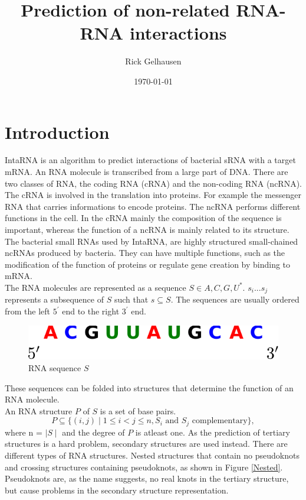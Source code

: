\documentclass[11pt,a4paper]{report}
\title{Prediction of non-related RNA-RNA interactions}
\date{\today}
\author{Rick Gelhausen}
\newcommand{\seq}{S} %
\newcommand{\str}{P} %
\begin{document}
\maketitle
\section*{Introduction}
IntaRNA is an algorithm to predict interactions of bacterial sRNA with a target mRNA. An RNA molecule is transcribed from a large part of DNA. There are two classes of RNA, the coding RNA (cRNA) and the non-coding RNA (ncRNA). The cRNA is involved in the translation into proteins. For example the messenger RNA that carries informations to encode proteins. The ncRNA performs different functions in the cell. In the cRNA mainly the composition of the sequence is important, whereas the function of a ncRNA is mainly related to its structure.\\
The bacterial small RNAs used by IntaRNA, are highly structured small-chained ncRNAs produced by bacteria. They can have multiple functions, such as the modification of the function of proteins or regulate gene creation by binding to mRNA.\\
The RNA molecules are represented as a sequence $\seq\in {A,C,G,U}^*$. $s_{i}...s_{j}$ represents a subsequence of $\seq$ such that $s \subseteq \seq$. The sequences are usually ordered from the left $5^\prime$ end to the right $3^\prime$ end.\\
\begin{figure}[H]
\centering
\includegraphics[scale=1]{seqExample.pdf}
\caption{RNA sequence $\seq$}
\end{figure}
\noindent
These sequences can be folded into structures that determine the function of an RNA molecule.\\
An RNA structure $\str$ of $\seq$ is a set of base pairs.
\begin{equation*}
\str\subseteq \{(i,j)\mid 1 \leq i < j \leq n, \seq_i \text{ and } \seq_j \text{ complementary}\},
\end{equation*}
where n = $\mid \seq \mid$ and the degree of $\str$ is atleast one.
As the prediction of tertiary structures is a hard problem, secondary structures are used instead.
There are different types of RNA structures. Nested structures that contain no pseudoknots and crossing structures containing pseudoknots, as shown in Figure \ref{Nested}. Pseudoknots are, as the name suggests, no real knots in the tertiary structure, but cause problems in the secondary structure representation.
\end{document}
